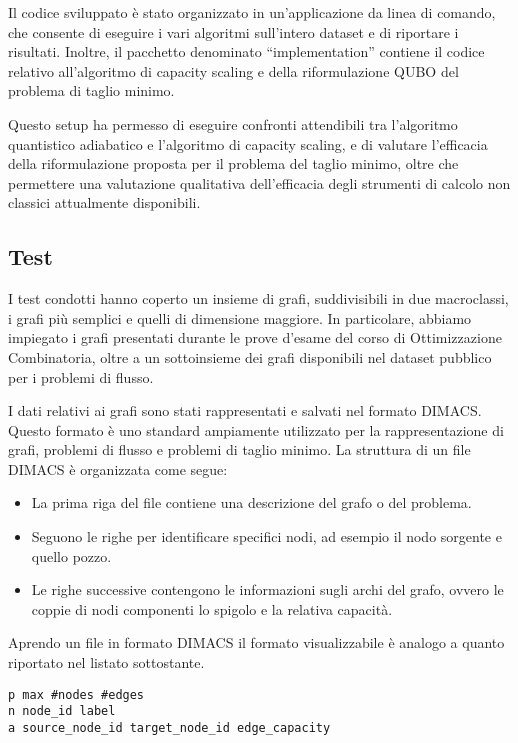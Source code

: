 \documentclass{article}
\begin{document}
Il codice sviluppato è stato organizzato in un'applicazione da linea di comando, che consente di eseguire i vari algoritmi sull'intero dataset e di riportare i risultati. Inoltre, il pacchetto denominato ``implementation'' contiene il codice relativo all'algoritmo di capacity scaling e della riformulazione QUBO del problema di taglio minimo.

Questo setup ha permesso di eseguire confronti attendibili tra l'algoritmo quantistico adiabatico e l'algoritmo di capacity scaling, e di valutare l'efficacia della riformulazione proposta per il problema del taglio minimo, oltre che permettere una valutazione qualitativa dell'efficacia degli strumenti di calcolo non classici attualmente disponibili.
\pagebreak

\subsection{Test}
I test condotti hanno coperto un insieme di grafi, suddivisibili in due macroclassi, i grafi più semplici e quelli di dimensione maggiore. In particolare, abbiamo impiegato i grafi presentati durante le prove d'esame del corso di Ottimizzazione Combinatoria, oltre a un sottoinsieme dei grafi disponibili nel dataset pubblico per i problemi di flusso\cite{Jensen2022}.

I dati relativi ai grafi sono stati rappresentati e salvati nel formato \textsc{DIMACS}. Questo formato è uno standard ampiamente utilizzato per la rappresentazione di grafi, problemi di flusso e problemi di taglio minimo. La struttura di un file \textsc{DIMACS} è organizzata come segue:

\begin{itemize}
    \item La prima riga del file contiene una descrizione del grafo o del problema.
    \item Seguono le righe per identificare specifici nodi, ad esempio il nodo sorgente e quello pozzo.
    \item Le righe successive contengono le informazioni sugli archi del grafo, ovvero le coppie di nodi componenti lo spigolo e la relativa capacità.
\end{itemize}

Aprendo un file in formato \textsc{DIMACS} il formato visualizzabile è analogo a quanto riportato nel listato sottostante.

\begin{lstlisting}
p max #nodes #edges
n node_id label
a source_node_id target_node_id edge_capacity    
\end{lstlisting}
\end{document}
